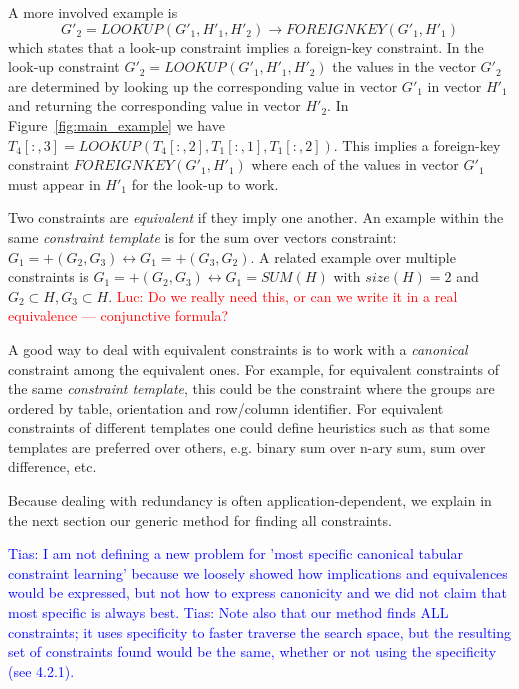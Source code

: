 \documentclass{sig-alternate-05-2015}
\newcommand{\tias}[1]{\textcolor{blue}{{\sc Tias:} #1}\xspace}
\newcommand{\luc}[1]{\textcolor{red}{{\sc Luc:} #1}\xspace}
\newcommand{\format}[1]{\textit{#1}\xspace}
\newcommand{\template}{\format{constraint template}}
\newcommand{\range}[3]{\ensuremath{#1[#2,#3]}}
\newcommand{\rangeall}{:}
\newcommand{\eccalc}[2]{\ensuremath{#1 = #2}}
\newcommand{\ecfkey}[2]{\ensuremath{\mathit{FOREIGNKEY}(#1,#2)}}
\newcommand{\eclookupf}[4]{\ensuremath{\mathit{LOOKUP}_{\mathit{#4}}(#1, #2, #3)}}
\newcommand{\eclookup}[4]{\eccalc{#1}{\eclookupf{#2}{#3}{#4}{}}}
\begin{document}
A more involved example is
$$\eclookup{G'_2}{G'_1}{H'_1}{H'_2} \rightarrow \ecfkey{G'_1}{H'_1}$$
which states
that a look-up constraint implies a foreign-key constraint. In the look-up constraint $\eclookup{G'_2}{G'_1}{H'_1}{H'_2}$ the values in the vector $G'_2$ are determined by looking up the corresponding value in vector $G'_1$ in vector $H'_1$ and returning the corresponding value in vector $H'_2$. In Figure~\ref{fig:main_example} we have $\eclookup{\range{T_{4}}{\rangeall}{3}}{\range{T_{4}}{\rangeall}{2}}{\range{T_{1}}{\rangeall}{1}}{\range{T_{1}}{\rangeall}{2}}$. This implies a foreign-key constraint $\ecfkey{G'_1}{H'_1}$ where each of the values in vector $G'_1$ must appear in $H'_1$ for the look-up to work.

Two constraints are \textit{equivalent} if they imply one another. %
An example within the same \template is for the sum over vectors constraint: $G_1 = +(G_2, G_3) \leftrightarrow G_1 = +(G_3, G_2)$. A related example over multiple constraints is $G_1 = +(G_2, G_3) \leftrightarrow G_1 = \textit{SUM}(H)$ with $\textit{size}(H) = 2$ and $G_2 \subset H, G_3 \subset H$.
\luc{Do we really need this, or can we write it in a real equivalence --- conjunctive formula?}

A good way to deal with equivalent constraints is to work with a \textit{canonical} constraint among the equivalent ones. For example, for equivalent constraints of the same \template, this could be the constraint where the groups are ordered by table, orientation and row/column identifier. For equivalent constraints of different templates one could define heuristics such as that some templates are preferred over others, e.g. binary sum over n-ary sum, sum over difference, etc.

Because dealing with redundancy is often application-dependent, we explain in the next section our generic method for finding all constraints.

\tias{I am not defining a new problem for 'most specific canonical tabular constraint learning' because we loosely showed how implications and equivalences would be expressed, but not how to express canonicity and we did not claim that most specific is always best.}
\tias{Note also that our method finds ALL constraints; it uses specificity to faster traverse the search space, but the resulting set of constraints found would be the same, whether or not using the specificity (see 4.2.1).}
\end{document}
